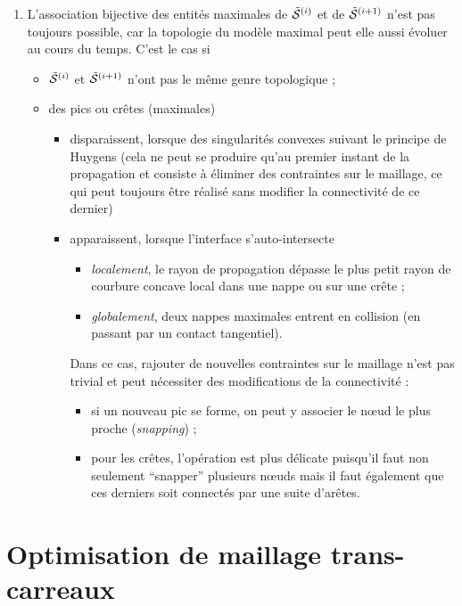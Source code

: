 \begin{enumerate}
	\item L'association bijective des entités maximales de $\tilde{\mathcal{S}}^{(i)}$ et de $\tilde{\mathcal{S}}^{(i+1)}$ n'est pas toujours possible, car la topologie du modèle maximal peut elle aussi évoluer au cours du temps.
	C'est le cas si
    \begin{itemize}
        \item $\tilde{\mathcal{S}}^{(i)}$ et $\tilde{\mathcal{S}}^{(i+1)}$ n'ont pas le même genre topologique ;
        \item des pics ou crêtes (maximales)
        \begin{itemize}
            \item disparaissent, lorsque des singularités convexes  suivant le principe de Huygens (cela ne peut se produire qu'au premier instant de la propagation et consiste à éliminer des contraintes sur le maillage, ce qui peut toujours être réalisé sans modifier la connectivité de ce dernier)
            \item apparaissent, lorsque l'interface s'auto-intersecte
            \begin{itemize}
                \item \textit{localement}, \ie le rayon de propagation dépasse le plus petit rayon de courbure concave local dans une nappe ou sur une crête ;
                \item \textit{globalement}, \eg deux nappes maximales entrent en collision (en passant par un contact tangentiel).
            \end{itemize} 
            Dans ce cas, rajouter de nouvelles contraintes sur le maillage n'est pas trivial et peut nécessiter des modifications de la connectivité :
            \begin{itemize}
                \item si un nouveau pic se forme, on peut y associer le n\oe ud le plus proche (\textit{snapping}) ;
                \item pour les crêtes, l'opération est plus délicate puisqu'il faut non seulement ``snapper'' plusieurs n\oe uds mais il faut également que ces derniers soit connectés par une suite d'arêtes.
            \end{itemize}
        \end{itemize}
    \end{itemize}
	
\end{enumerate}


\section{Optimisation de maillage trans-carreaux}


